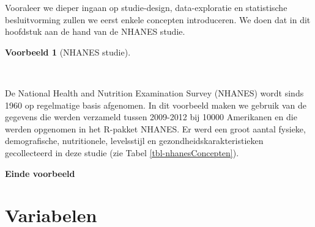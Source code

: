 \documentclass[
  dutch,
  letterpaper,
  12pt]{book}
\theoremstyle{definition}
\theoremstyle{definition}
\theoremstyle{definition}
\newtheorem{example}{Voorbeeld}[chapter]
\theoremstyle{remark}
\begin{document}
Vooraleer we dieper ingaan op studie-design, data-exploratie en
statistische besluitvorming zullen we eerst enkele concepten
introduceren. We doen dat in dit hoofdstuk aan de hand van de NHANES
studie.

\begin{example}[NHANES
studie]\protect\hypertarget{exm-nhanesExConcepten}{}\label{exm-nhanesExConcepten}

~

\end{example}

De National Health and Nutrition Examination Survey (NHANES) wordt sinds
1960 op regelmatige basis afgenomen. In dit voorbeeld maken we gebruik
van de gegevens die werden verzameld tussen 2009-2012 bij 10000
Amerikanen en die werden opgenomen in het R-pakket NHANES. Er werd een
groot aantal fysieke, demografische, nutritionele, levelsstijl en
gezondheidskarakteristieken gecollecteerd in deze studie (zie Tabel
\ref{tbl-nhanesConcepten}).

\textbf{Einde voorbeeld}

\begin{table}

\caption{\label{tbl-nhanesConcepten}}


\end{table}%

\section{Variabelen}\label{variabelen}
\end{document}

